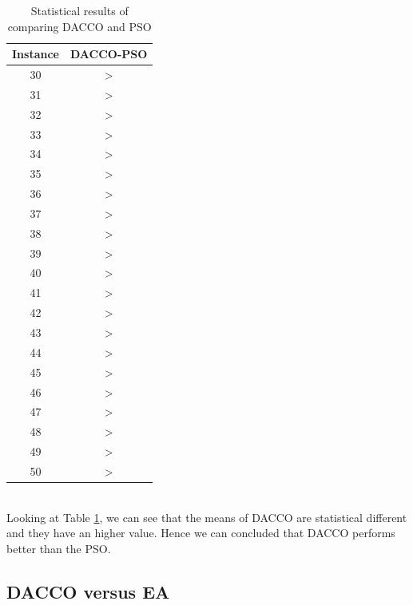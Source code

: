 		\begin{table}[!htdp]
				\begin{center}
					\begin{tabular}{| c | c |}
						\hline
						\textbf{Instance} & \textbf{DACCO-PSO} \\ \hline
						30 & > \\ \hline
						31 & > \\ \hline
						32 & > \\ \hline
						33 & > \\ \hline
						34 & > \\ \hline
						35 & > \\ \hline
						36 & > \\ \hline
						37 & > \\ \hline
						38 & > \\ \hline
						39 & > \\ \hline
						40 & > \\ \hline
						41 & > \\ \hline
						42 & > \\ \hline
						43 & > \\ \hline
						44 & > \\ \hline
						45 & > \\ \hline
						46 & > \\ \hline
						47 & > \\ \hline
						48 & > \\ \hline 
						49 & > \\ \hline
						50 & > \\ \hline
					\end{tabular}
					\caption{Statistical results of comparing DACCO and PSO}
					\label{tab:statistical_comparison_pso}
				\end{center}
		\end{table}
		\\ Looking at Table \ref{tab:statistical_comparison_pso}, we can see that the means of DACCO are statistical different and they have an higher value. Hence we can concluded that DACCO performs better than the PSO.
		\pagebreak
		\subsection{DACCO versus EA}
		
